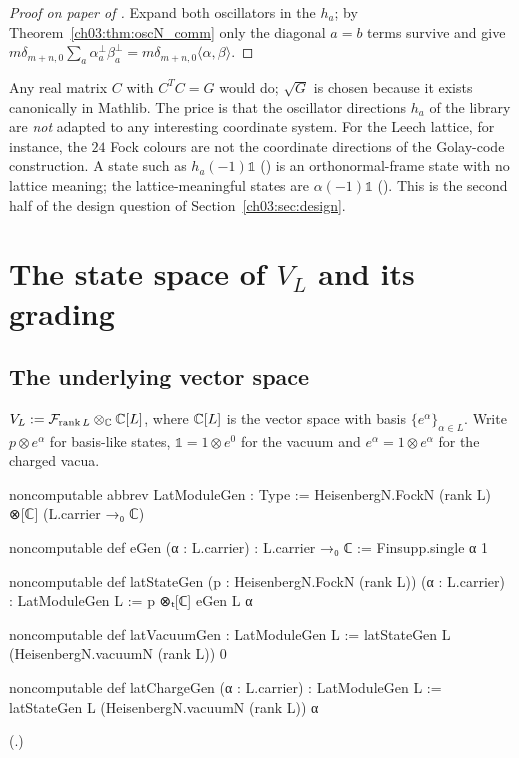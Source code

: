 \begin{proof}[Proof on paper of ]
Expand both oscillators in the $h_a$; by Theorem~\ref{ch03:thm:oscN_comm} only the diagonal
$a=b$ terms survive and give $m\delta_{m+n,0}\sum_a\alpha_a^\perp\beta_a^\perp=m\delta_{m+n,0}
\langle\alpha,\beta\rangle$.
\end{proof}

\begin{remark}\label{ch03:rem:sqrtG}
Any real matrix $C$ with $C^TC=G$ would do; $\sqrt G$ is chosen because it exists canonically in
Mathlib. The price is that the oscillator directions $h_a$ of the library are \emph{not} adapted
to any interesting coordinate system. For the Leech lattice, for instance, the $24$ Fock colours
are not the coordinate directions of the Golay-code construction. A state such as
$h_a(-1)\mathbb 1$ () is an orthonormal-frame state with no lattice meaning; the
lattice-meaningful states are $\alpha(-1)\mathbb 1$ (). This is the second half of the
design question of Section~\ref{ch03:sec:design}.
\end{remark}

\section{The state space of \texorpdfstring{$V_L$}{V\_L} and its grading}\label{ch03:sec:latticespace}

\subsection{The underlying vector space}

\begin{definition}\label{ch03:def:LatModuleGen}
$V_L:=\mathcal F_{\operatorname{rank}L}\otimes_{{\mathbb{C}}}{\mathbb{C}}[L]$, where ${\mathbb{C}}[L]$ is the vector space with
basis $\{e^\alpha\}_{\alpha\in L}$. Write $p\otimes e^\alpha$ for basis-like states, $\mathbb 1=
1\otimes e^0$ for the vacuum and $e^\alpha=1\otimes e^\alpha$ for the charged vacua.
\end{definition}
\begin{leancode}
noncomputable abbrev LatModuleGen : Type :=
  HeisenbergN.FockN (rank L) ⊗[ℂ] (L.carrier →₀ ℂ)

noncomputable def eGen (α : L.carrier) : L.carrier →₀ ℂ := Finsupp.single α 1

noncomputable def latStateGen (p : HeisenbergN.FockN (rank L)) (α : L.carrier) : LatModuleGen L :=
  p ⊗ₜ[ℂ] eGen L α

noncomputable def latVacuumGen : LatModuleGen L :=
  latStateGen L (HeisenbergN.vacuumN (rank L)) 0

noncomputable def latChargeGen (α : L.carrier) : LatModuleGen L :=
  latStateGen L (HeisenbergN.vacuumN (rank L)) α
\end{leancode}
(.)

